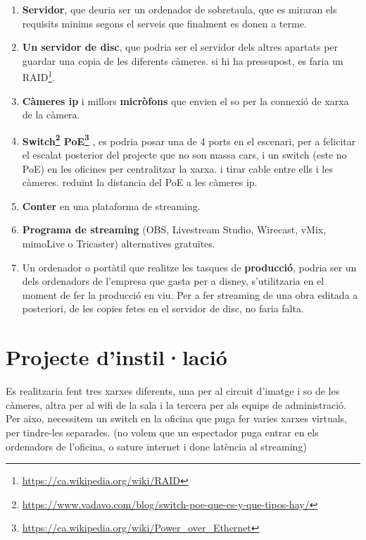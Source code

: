 \documentclass[
  10pt,
]{book}
\DeclareRobustCommand{\href}[2]{#2\footnote{\url{#1}}}
\begin{document}
\begin{enumerate}
\def\labelenumi{\arabic{enumi}.}
\item
  \textbf{Servidor}, que deuria ser un ordenador de sobretaula, que es miraran els requisits minims segons el serveis que finalment es donen a terme.
\item
  \textbf{Un servidor de disc}, que podria ser el servidor dels altres apartats per guardar una copia de les diferents càmeres. si hi ha pressupost, es faria un \href{https://ca.wikipedia.org/wiki/RAID}{RAID}.
\item
  \textbf{Càmeres ip} i millors \textbf{micròfons} que envien el so per la connexió de xarxa de la càmera.
\item
  \textbf{\href{https://www.vadavo.com/blog/switch-poe-que-es-y-que-tipos-hay/}{Switch} \href{https://ca.wikipedia.org/wiki/Power_over_Ethernet}{PoE}} , es podria posar una de 4 ports en el escenari, per a felicitar el escalat posterior del projecte que no son massa cars, i un switch (este no PoE) en les oficines per centralitzar la xarxa. i tirar cable entre ells i les càmeres. reduint la distancia del PoE a les càmeres ip.
\item
  \textbf{Conter} en una plataforma de streaming.
\item
  \textbf{Programa de streaming} (OBS, Livestream Studio, Wirecast, vMix, mimoLive o Tricaster) alternatives gratuïtes.
\item
  Un ordenador o portàtil que realitze les tasques de \textbf{producció}, podria ser un dels ordenadors de l'empresa que gasta per a disney, s'utilitzaria en el moment de fer la producció en viu. Per a fer streaming de una obra editada a posteriori, de les copies fetes en el servidor de disc, no faria falta.
\end{enumerate}

\hypertarget{projecte-dinstillaciuxf3}{%
\section{Projecte d'instil·lació}\label{projecte-dinstillaciuxf3}}

Es realitzaria fent tres xarxes diferents, una per al circuit d'imatge i so de les càmeres, altra per al wifi de la sala i la tercera per als equips de administració. Per aixo, necessitem un switch en la oficina que puga fer varies xarxes virtuals, per tindre-les separades. (no volem que un espectador puga entrar en els ordenadors de l'oficina, o sature internet i done latència al streaming)
\end{document}
